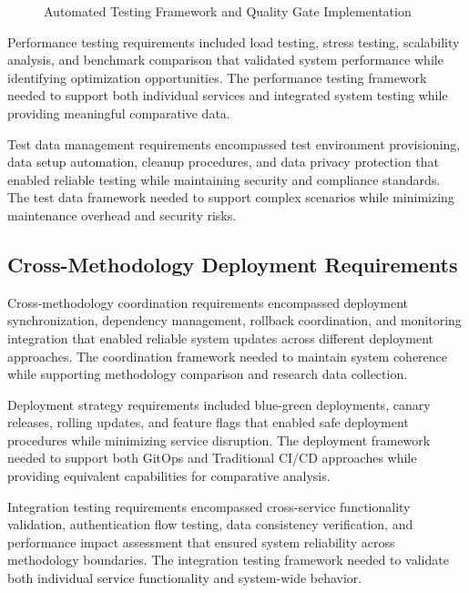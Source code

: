 \begin{figure}[H]
\centering
\caption{Automated Testing Framework and Quality Gate Implementation}
\label{fig:automated-testing-pipeline}
\end{figure}

Performance testing requirements included load testing, stress testing, scalability analysis, and benchmark comparison that validated system performance while identifying optimization opportunities. The performance testing framework needed to support both individual services and integrated system testing while providing meaningful comparative data.

Test data management requirements encompassed test environment provisioning, data setup automation, cleanup procedures, and data privacy protection that enabled reliable testing while maintaining security and compliance standards. The test data framework needed to support complex scenarios while minimizing maintenance overhead and security risks.

\subsection{Cross-Methodology Deployment Requirements}

Cross-methodology coordination requirements encompassed deployment synchronization, dependency management, rollback coordination, and monitoring integration that enabled reliable system updates across different deployment approaches. The coordination framework needed to maintain system coherence while supporting methodology comparison and research data collection.

Deployment strategy requirements included blue-green deployments, canary releases, rolling updates, and feature flags that enabled safe deployment procedures while minimizing service disruption. The deployment framework needed to support both GitOps and Traditional CI/CD approaches while providing equivalent capabilities for comparative analysis.

Integration testing requirements encompassed cross-service functionality validation, authentication flow testing, data consistency verification, and performance impact assessment that ensured system reliability across methodology boundaries. The integration testing framework needed to validate both individual service functionality and system-wide behavior.

